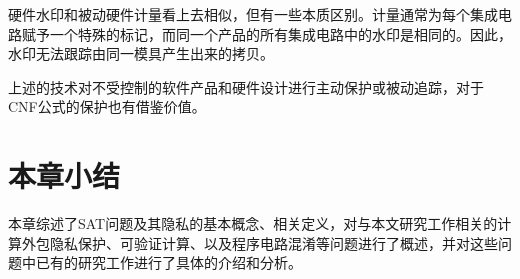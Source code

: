 硬件水印和被动硬件计量看上去相似，但有一些本质区别。计量通常为每个集成电路赋予一个特殊的标记，而同一个产品的所有集成电路中的水印是相同的。因此，水印无法跟踪由同一模具产生出来的拷贝。

上述的技术对不受控制的软件产品和硬件设计进行主动保护或被动追踪，对于CNF公式的保护也有借鉴价值。

\section{本章小结}
本章综述了SAT问题及其隐私的基本概念、相关定义，对与本文研究工作相关的计算外包隐私保护、可验证计算、以及程序电路混淆等问题进行了概述，并对这些问题中已有的研究工作进行了具体的介绍和分析。
